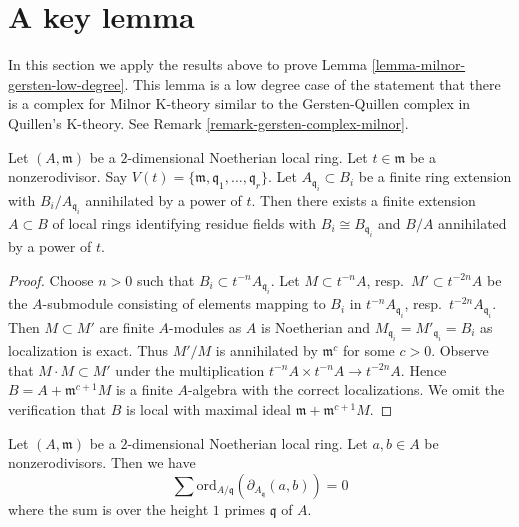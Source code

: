 \section{A key lemma}
\label{section-key-lemma}

\noindent
In this section we apply the results above to prove
Lemma \ref{lemma-milnor-gersten-low-degree}.
This lemma is a low degree case of the statement
that there is a complex for Milnor K-theory similar
to the Gersten-Quillen complex in Quillen's K-theory.
See Remark \ref{remark-gersten-complex-milnor}.

\begin{lemma}
\label{lemma-perpare-key}
Let $(A, \mathfrak m)$ be a $2$-dimensional Noetherian local ring.
Let $t \in \mathfrak m$ be a nonzerodivisor. Say
$V(t) = \{\mathfrak m, \mathfrak q_1, \ldots, \mathfrak q_r\}$.
Let $A_{\mathfrak q_i} \subset B_i$ be a finite ring
extension with $B_i/A_{\mathfrak q_i}$ annihilated by a power of
$t$. Then there exists a finite extension $A \subset B$ of
local rings identifying residue fields
with $B_i \cong B_{\mathfrak q_i}$ and $B/A$ annihilated
by a power of $t$.
\end{lemma}

\begin{proof}
Choose $n > 0$ such that $B_i \subset t^{-n}A_{\mathfrak q_i}$.
Let $M \subset t^{-n}A$, resp.\ $M' \subset t^{-2n}A$ be the
$A$-submodule consisting of elements mapping to $B_i$ in
$t^{-n}A_{\mathfrak q_i}$, resp.\ $t^{-2n}A_{\mathfrak q_i}$.
Then $M \subset M'$ are finite $A$-modules as $A$ is Noetherian
and $M_{\mathfrak q_i} = M'_{\mathfrak q_i} = B_i$ as localization
is exact. Thus $M'/M$ is annihilated by $\mathfrak m^c$ for some
$c > 0$. Observe that $M \cdot M \subset M'$ under the multiplication
$t^{-n}A \times t^{-n}A \to t^{-2n}A$. Hence
$B = A + \mathfrak m^{c + 1}M$ is a finite $A$-algebra with the correct
localizations. We omit the verification that $B$ is local with
maximal ideal $\mathfrak m + \mathfrak m^{c + 1}M$.
\end{proof}

\begin{lemma}
\label{lemma-key-nonzerodivisors}
Let $(A, \mathfrak m)$ be a $2$-dimensional Noetherian local ring.
Let $a, b \in A$ be nonzerodivisors.
Then we have
$$
\sum
\text{ord}_{A/\mathfrak q}(\partial_{A_{\mathfrak q}}(a, b))
=
0
$$
where the sum is over the height $1$ primes $\mathfrak q$ of $A$.
\end{lemma}

